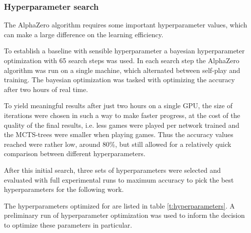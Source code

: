 \documentclass[12pt,onecolumn,oneside,titlepage]{article}
\begin{document}
\subsubsection{Hyperparameter search}

The AlphaZero algorithm requires some important hyperparameter values, which can make a large difference on the learning efficiency. 

To establish a baseline with sensible hyperparameter a bayesian hyperparameter optimization with 65 search steps was used.
In each search step the AlphaZero algorithm was run on a single machine, which alternated between self-play and training. The bayesian optimization was tasked with optimizing the accuracy after two hours of real time. 

To yield meaningful results after just two hours on a single GPU,
the size of iterations were chosen in such a way to make faster progress, at the cost of the quality of the final results, i.e. less games were played per network trained and the MCTS-trees were smaller when playing games. Thus the accuracy values reached were rather low, around $80\%$,
but still allowed for a relatively quick comparison between different hyperparameters. 

After this initial search, three sets of hyperparameters were selected and evaluated with full experimental runs to maximum accuracy to pick the best hyperparameters for the following work.

The hyperparameters optimized for are listed in table \ref{t:hyperparameters}. A preliminary run of hyperparameter optimization was used to inform the decision to optimize these parameters in particular.
\end{document}
